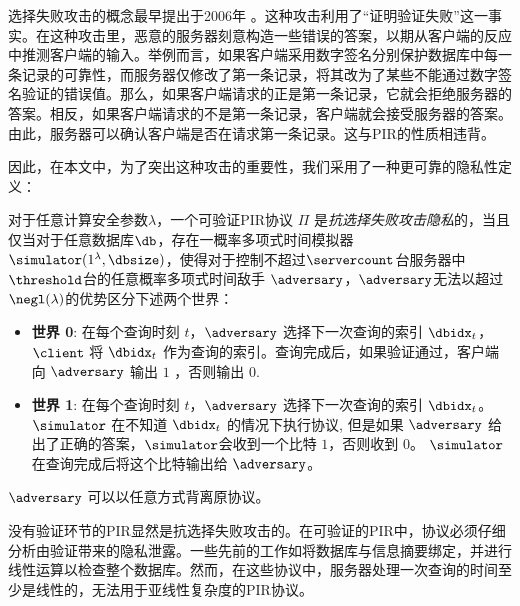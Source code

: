 选择失败攻击的概念最早提出于2006年 \cite{Kiraz2006API}。这种攻击利用了“证明验证失败”这一事实。在这种攻击里，恶意的服务器刻意构造一些错误的答案，以期从客户端的反应中推测客户端的输入。举例而言，如果客户端采用数字签名分别保护数据库中每一条记录的可靠性，而服务器仅修改了第一条记录，将其改为了某些不能通过数字签名验证的错误值。那么，如果客户端请求的正是第一条记录，它就会拒绝服务器的答案。相反，如果客户端请求的不是第一条记录，客户端就会接受服务器的答案。由此，服务器可以确认客户端是否在请求第一条记录。这与PIR的性质相违背。

因此，在本文中，为了突出这种攻击的重要性，我们采用了一种更可靠的隐私性定义：

\begin{definition}[抗选择失败攻击的隐私性]
    \label{def:privacy-sfa}
    对于任意计算安全参数$\lambda$，一个可验证PIR协议 $\Pi$ 是\textit{抗选择失败攻击隐私}的，当且仅当对于任意数据库$\db$，存在一概率多项式时间模拟器 $\simulator(1^\lambda, \dbsize)$，使得对于控制不超过$\servercount$台服务器中$\threshold$台的任意概率多项式时间敌手 $\adversary$，$\adversary$无法以超过 $\negl(\lambda)$的优势区分下述两个世界：
    \begin{itemize}
        \item \textbf{世界 0}: 在每个查询时刻 $t$，$\adversary$ 选择下一次查询的索引 $\dbidx_t$， $\client$ 将 $\dbidx_t$ 作为查询的索引。查询完成后，如果验证通过，客户端向 $\adversary$ 输出 $1$ ，否则输出 $0$.
        \item \textbf{世界 1}: 在每个查询时刻 $t$，$\adversary$ 选择下一次查询的索引 $\dbidx_t$。$\simulator$ 在不知道  $\dbidx_t$ 的情况下执行协议, 但是如果 $\adversary$ 给出了正确的答案，$\simulator$会收到一个比特 $1$，否则收到 $0$。 $\simulator$ 在查询完成后将这个比特输出给 $\adversary$。
    \end{itemize}

    $\adversary$ 可以以任意方式背离原协议。
\end{definition}

没有验证环节的PIR显然是抗选择失败攻击的。在可验证的PIR中，协议必须仔细分析由验证带来的隐私泄露。一些先前的工作如\cite{APIR, VeriSimplePIR}将数据库与信息摘要绑定，并进行线性运算以检查整个数据库。然而，在这些协议中，服务器处理一次查询的时间至少是线性的，无法用于亚线性复杂度的PIR协议。